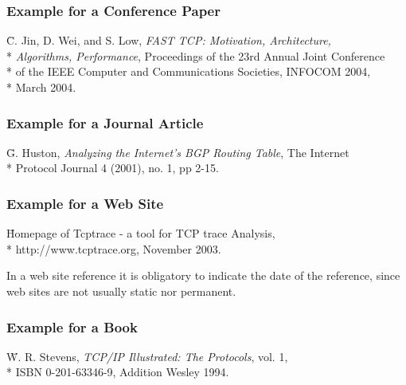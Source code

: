 \subsubsection*{Example for a Conference Paper}

\begin{tabbing}
  [JWL04] \= C. Jin, D. Wei, and S. Low, \emph{FAST TCP: Motivation,
  Architecture,} \\*
  \> \emph{Algorithms, Performance}, Proceedings of the 23rd Annual Joint
  Conference \\*
  \> of the IEEE Computer and Communications Societies, INFOCOM 2004,
  \\*
  \> March 2004.
\end{tabbing}


\subsubsection*{Example for a Journal Article}

\begin{tabbing}
  [Hus01] \= G. Huston, \emph{Analyzing the Internet's BGP Routing Table},
 The Internet\\*
 \> Protocol Journal 4 (2001), no. 1, pp 2-15.
\end{tabbing}


\subsubsection*{Example for a Web Site}

\begin{tabbing}
  [TCP03] \= Homepage of Tcptrace - a tool for TCP trace Analysis, \\*
  \> http://www.tcptrace.org, November 2003.
\end{tabbing}

In a web site reference it is obligatory to indicate the date of the reference,
since web sites are not usually static nor permanent.


\subsubsection*{Example for a Book}

\begin{tabbing}
  [Ste94] \= W. R. Stevens, \emph{TCP/IP Illustrated: The Protocols}, vol. 1,
  \\*
  \> ISBN 0-201-63346-9, Addition Wesley 1994.
\end{tabbing}


